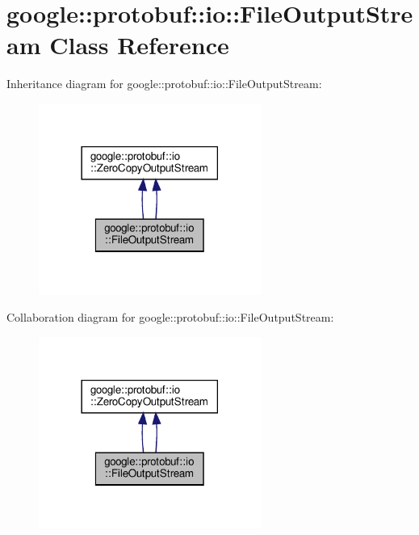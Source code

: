 \hypertarget{classgoogle_1_1protobuf_1_1io_1_1FileOutputStream}{}\section{google\+:\+:protobuf\+:\+:io\+:\+:File\+Output\+Stream Class Reference}
\label{classgoogle_1_1protobuf_1_1io_1_1FileOutputStream}


Inheritance diagram for google\+:\+:protobuf\+:\+:io\+:\+:File\+Output\+Stream\+:
\nopagebreak
\begin{figure}[H]
\begin{center}
\leavevmode
\includegraphics[width=206pt]{classgoogle_1_1protobuf_1_1io_1_1FileOutputStream__inherit__graph}
\end{center}
\end{figure}


Collaboration diagram for google\+:\+:protobuf\+:\+:io\+:\+:File\+Output\+Stream\+:
\nopagebreak
\begin{figure}[H]
\begin{center}
\leavevmode
\includegraphics[width=206pt]{classgoogle_1_1protobuf_1_1io_1_1FileOutputStream__coll__graph}
\end{center}
\end{figure}
